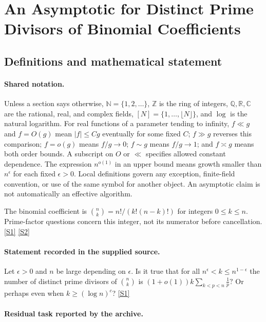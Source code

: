\documentclass[11pt,a4paper]{article}
\newcommand{\N}{\mathbb{N}}
\newcommand{\Z}{\mathbb{Z}}
\newcommand{\Q}{\mathbb{Q}}
\newcommand{\R}{\mathbb{R}}
\newcommand{\C}{\mathbb{C}}
\newcommand{\sref}[2]{\hyperlink{source:#1:#2}{[S#2]}}
\begin{document}
\section{An Asymptotic for Distinct Prime Divisors of Binomial Coefficients}\label{statement}


\subsection{Definitions and mathematical statement}

\paragraph{Shared notation.}Unless a section says otherwise, $\N=\{1,2,\ldots\}$,
$\Z$ is the ring of integers, $\Q,\R,\C$ are the rational, real, and complex
fields, $[N]=\{1,\ldots,\lfloor N\rfloor\}$, and $\log$ is the natural
logarithm. For real functions of a parameter tending to infinity,
$f\ll g$ and $f=O(g)$ mean $|f|\leq Cg$ eventually for some fixed $C$;
$f\gg g$ reverses this comparison; $f=o(g)$ means $f/g\to0$;
$f\sim g$ means $f/g\to1$; and $f\asymp g$ means both order bounds.
A subscript on $O$ or $\ll$ specifies allowed constant dependence.
The expression $n^{o(1)}$ in an upper bound means growth smaller than
$n^\epsilon$ for each fixed $\epsilon>0$. Local definitions govern any
exception, finite-field convention, or use of the same symbol for another
object. An asymptotic claim is not automatically an effective algorithm.



The binomial coefficient is $\binom nk=n!/(k!(n-k)!)$ for integers $0\leq k\leq n$. Prime-factor questions concern this integer, not its numerator before cancellation. \sref{statement}{1} \sref{statement}{2}

\paragraph{Statement recorded in the supplied source.}
Let $\epsilon>0$ and $n$ be large depending on $\epsilon$. Is it true that for all $n^\epsilon<k\leq n^{1-\epsilon}$ the number of distinct prime divisors of $\binom{n}{k}$ is $ (1+o(1))k\sum_{k<p<n}\frac{1}{p}? $ Or perhaps even when $k \geq (\log n)^c$? \sref{statement}{1}

\paragraph{Residual task reported by the archive.}
\end{document}
